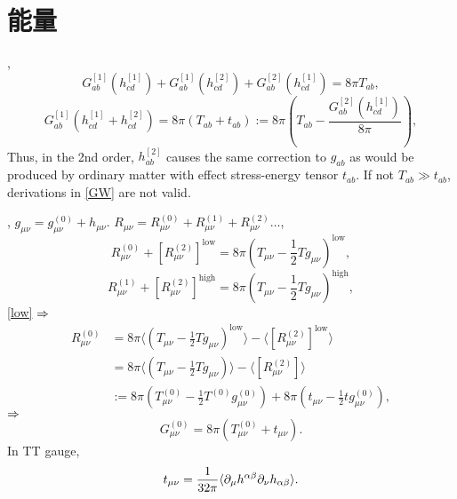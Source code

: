 \chapter{能量}

\cite{Wald1984}, 
\begin{equation}
    G_{ab}^{[1]}(h_{cd}^{[1]})+G_{ab}^{[1]}(h_{cd}^{[2]})+G_{ab}^{[2]}(h_{cd}^{[1]})=8\pi T_{ab},
\end{equation}
\begin{equation}
    G_{ab}^{[1]}(h_{cd}^{[1]}+h_{cd}^{[2]})=8\pi (T_{ab}+t_{ab}):=8\pi (T_{ab}-\frac{G_{ab}^{[2]}(h_{cd}^{[1]})}{8\pi}),
\end{equation}
Thus, in the 2nd order, $h_{ab}^{[2]}$ causes the same correction to $g_{ab}$ as would be produced by ordinary matter with effect stress-energy tensor $t_{ab}$. If not $T_{ab}\gg t_{ab}$, derivations in \ref{GW} are not valid.

\cite{Maggiore2014}, $g_{\mu\nu}={g}_{\mu\nu}^{(0)}+h_{\mu\nu}$. $R_{\mu\nu}=R_{\mu\nu}^{(0)}+R_{\mu\nu}^{(1)}+R_{\mu\nu}^{(2)}\dots$,
\begin{equation}
    R_{\mu\nu}^{(0)}+[R_{\mu\nu}^{(2)}]^\text{low}=8\pi(T_{\mu\nu}-\frac{1}{2}Tg_{\mu\nu})^\text{low},\label{low}
\end{equation}
\begin{equation}
    R_{\mu\nu}^{(1)}+[R_{\mu\nu}^{(2)}]^\text{high}=8\pi(T_{\mu\nu}-\frac{1}{2}Tg_{\mu\nu})^\text{high},\label{high}
\end{equation}
\eqref{low} $\Rightarrow$
\begin{align}
    R_{\mu\nu}^{(0)}&=8\pi\langle (T_{\mu\nu}-\frac{1}{2}Tg_{\mu\nu})^\text{low}\rangle-\langle[R_{\mu\nu}^{(2)}]^\text{low}\rangle\\
    &=8\pi\langle (T_{\mu\nu}-\frac{1}{2}Tg_{\mu\nu})\rangle-\langle[R_{\mu\nu}^{(2)}]\rangle\\
    &:=8\pi({T}_{\mu\nu}^{(0)}-\frac{1}{2}{T}^{(0)}{g}_{\mu\nu}^{(0)})+8\pi(t_{\mu\nu}-\frac{1}{2}t{g}_{\mu\nu}^{(0)}),
\end{align}
$\Rightarrow$
\begin{equation}
    G_{\mu\nu}^{(0)}=8\pi({T}_{\mu\nu}^{(0)}+t_{\mu\nu}).
\end{equation}
In TT gauge,
\begin{equation}
    t_{\mu\nu}=\frac{1}{32\pi}\langle\partial_\mu h^{\alpha\beta}\partial_\nu h_{\alpha\beta}\rangle.
\end{equation}
